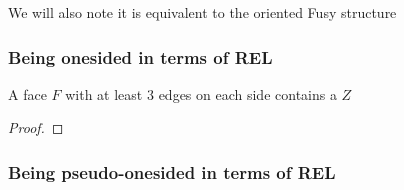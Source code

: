 We will also note it is equivalent to the oriented Fusy structure

\subsubsection{Being onesided in terms of REL}


\begin{lemma}
\label{lm:zInRedFace}
A face $F$ with at least $3$ edges on each side contains a $Z$
\end{lemma}
\begin{proof}
\end{proof}

\subsubsection{Being pseudo-onesided in terms of REL}
